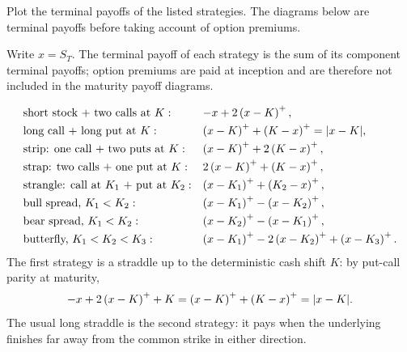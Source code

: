 \begin{exercise}
Plot the terminal payoffs of the listed strategies.  The diagrams below are
terminal payoffs before taking account of option premiums.
\end{exercise}

\begin{solution}
Write \(x=S_T\).  The terminal payoff of each strategy is the sum of its
component terminal payoffs; option premiums are paid at inception and are
therefore not included in the maturity payoff diagrams.

\[
\begin{array}{ll}
\text{short stock + two calls at }K:
  & -x+2\left(x-K\right)^+,\\[0.3em]
\text{long call + long put at }K:
  & \left(x-K\right)^++\left(K-x\right)^+=|x-K|,\\[0.3em]
\text{strip: one call + two puts at }K:
  & \left(x-K\right)^++2\left(K-x\right)^+,\\[0.3em]
\text{strap: two calls + one put at }K:
  & 2\left(x-K\right)^++\left(K-x\right)^+,\\[0.3em]
\text{strangle: call at }K_1\text{ + put at }K_2:
  & \left(x-K_1\right)^++\left(K_2-x\right)^+,\\[0.3em]
\text{bull spread, }K_1<K_2:
  & \left(x-K_1\right)^+-\left(x-K_2\right)^+,\\[0.3em]
\text{bear spread, }K_1<K_2:
  & \left(x-K_2\right)^+-\left(x-K_1\right)^+,\\[0.3em]
\text{butterfly, }K_1<K_2<K_3:
  & \left(x-K_1\right)^+-2\left(x-K_2\right)^++\left(x-K_3\right)^+.
\end{array}
\]
The first strategy is a straddle up to the deterministic cash shift \(K\):
by put-call parity at maturity,
\[
  -x+2\left(x-K\right)^++K=\left(x-K\right)^++\left(K-x\right)^+=|x-K|.
\]
The usual long straddle is the second strategy: it pays when the underlying
finishes far away from the common strike in either direction.

\begin{center}
\end{center}
\end{solution}
